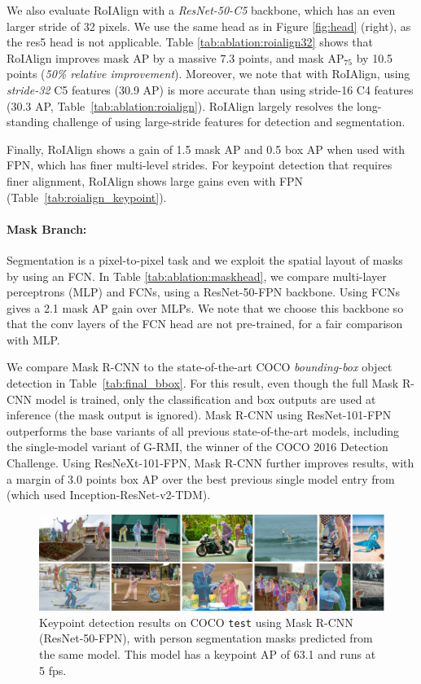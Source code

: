 We also evaluate RoIAlign with a \emph{ResNet-50-C5} backbone, which has an even larger stride of 32 pixels. We use the same head as in Figure \ref{fig:head} (right), as the res5 head is not applicable. Table \ref{tab:ablation:roialign32} shows that RoIAlign improves mask AP by a massive 7.3 points, and mask AP$_{75}$ by 10.5 points (\emph{50\% relative improvement}). Moreover, we note that with RoIAlign, using \emph{stride-32} C5 features (30.9 AP) is more accurate than using stride-16 C4 features (30.3 AP, Table~\ref{tab:ablation:roialign}). RoIAlign largely resolves the long-standing challenge of using large-stride features for detection and segmentation.

Finally, RoIAlign shows a gain of 1.5 mask AP and 0.5 box AP when used with FPN, which has finer multi-level strides. For keypoint detection that requires finer alignment, RoIAlign shows large gains even with FPN (Table~\ref{tab:roialign_keypoint}).

\paragraph{Mask Branch:} Segmentation is a pixel-to-pixel task and we exploit the spatial layout of masks by using an FCN. In Table \ref{tab:ablation:maskhead}, we compare multi-layer perceptrons (MLP) and FCNs, using a ResNet-50-FPN backbone. Using FCNs gives a 2.1 mask AP gain over MLPs. We note that we choose this backbone so that the conv layers of the FCN head are not pre-trained, for a fair comparison with MLP.


We compare Mask R-CNN to the state-of-the-art COCO \emph{bounding-box} object detection in Table~\ref{tab:final_bbox}. For this result, even though the full Mask R-CNN model is trained, only the classification and box outputs are used at inference (the mask output is ignored). Mask R-CNN using ResNet-101-FPN outperforms the base variants of all previous state-of-the-art models, including the single-model variant of G-RMI, the winner of the COCO 2016 Detection Challenge. Using ResNeXt-101-FPN, Mask R-CNN further improves results, with a margin of 3.0 points box AP over the best previous single model entry from (which used Inception-ResNet-v2-TDM).

\begin{figure}[t]
\centering
\includegraphics[width=1.0\linewidth]{figures/mask_rcnn/results_keypoints}
\caption{Keypoint detection results on COCO \texttt{test} using Mask R-CNN (ResNet-50-FPN), with person segmentation masks predicted from the same model. This model has a keypoint AP of 63.1 and runs at 5 fps.}
\label{fig:results_keypoints}
\end{figure}

